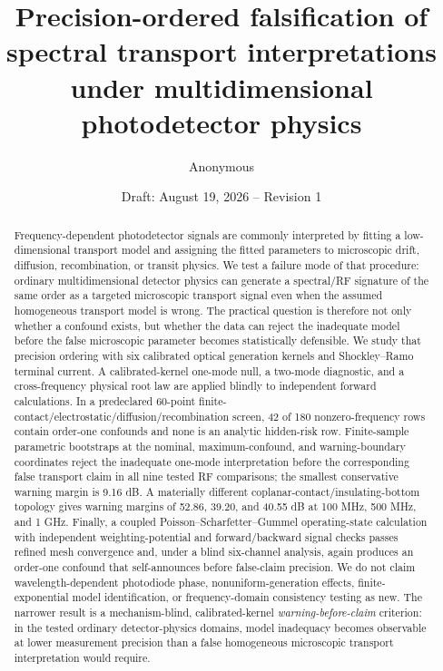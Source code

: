 \documentclass[11pt]{article}
\title{Precision-ordered falsification of spectral transport interpretations under multidimensional photodetector physics}
\author{Anonymous}
\date{Draft: August 19, 2026 -- Revision 1}
\begin{document}
\maketitle

\begin{abstract}
Frequency-dependent photodetector signals are commonly interpreted by fitting a low-dimensional transport model and assigning the fitted parameters to microscopic drift, diffusion, recombination, or transit physics. We test a failure mode of that procedure: ordinary multidimensional detector physics can generate a spectral/RF signature of the same order as a targeted microscopic transport signal even when the assumed homogeneous transport model is wrong. The practical question is therefore not only whether a confound exists, but whether the data can reject the inadequate model before the false microscopic parameter becomes statistically defensible. We study that precision ordering with six calibrated optical generation kernels and Shockley--Ramo terminal current. A calibrated-kernel one-mode null, a two-mode diagnostic, and a cross-frequency physical root law are applied blindly to independent forward calculations. In a predeclared 60-point finite-contact/electrostatic/diffusion/recombination screen, 42 of 180 nonzero-frequency rows contain order-one confounds and none is an analytic hidden-risk row. Finite-sample parametric bootstraps at the nominal, maximum-confound, and warning-boundary coordinates reject the inadequate one-mode interpretation before the corresponding false transport claim in all nine tested RF comparisons; the smallest conservative warning margin is 9.16 dB. A materially different coplanar-contact/insulating-bottom topology gives warning margins of 52.86, 39.20, and 40.55 dB at 100 MHz, 500 MHz, and 1 GHz. Finally, a coupled Poisson--Scharfetter--Gummel operating-state calculation with independent weighting-potential and forward/backward signal checks passes refined mesh convergence and, under a blind six-channel analysis, again produces an order-one confound that self-announces before false-claim precision. We do not claim wavelength-dependent photodiode phase, nonuniform-generation effects, finite-exponential model identification, or frequency-domain consistency testing as new. The narrower result is a mechanism-blind, calibrated-kernel \emph{warning-before-claim} criterion: in the tested ordinary detector-physics domains, model inadequacy becomes observable at lower measurement precision than a false homogeneous microscopic transport interpretation would require.
\end{abstract}
\end{document}
